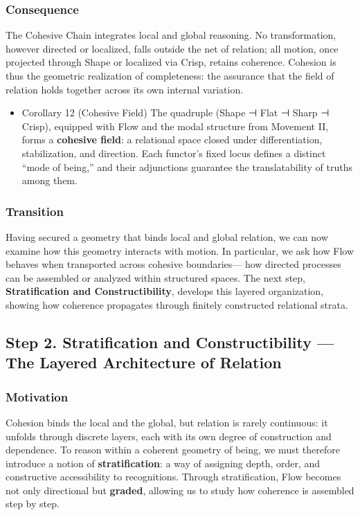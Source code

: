 \documentclass[11pt]{article}
\begin{document}
\subsubsection*{Consequence}
\label{sec:orgc48179e}
The Cohesive Chain integrates local and global reasoning.  
No transformation, however directed or localized, falls outside the net of relation;  
all motion, once projected through Shape or localized via Crisp, retains coherence.  
Cohesion is thus the geometric realization of completeness:  
the assurance that the field of relation holds together across its own internal variation.
\begin{itemize}
\item Corollary 12 (Cohesive Field)
\label{sec:org497c264}
The quadruple (Shape ⊣ Flat ⊣ Sharp ⊣ Crisp), equipped with Flow and the modal structure from Movement II,  
forms a \textbf{cohesive field}: a relational space closed under differentiation, stabilization, and direction.  
Each functor’s fixed locus defines a distinct “mode of being,”  
and their adjunctions guarantee the translatability of truths among them.
\end{itemize}
\subsubsection*{Transition}
\label{sec:org978a1ee}
Having secured a geometry that binds local and global relation,  
we can now examine how this geometry interacts with motion.  
In particular, we ask how Flow behaves when transported across cohesive boundaries—  
how directed processes can be assembled or analyzed within structured spaces.  
The next step, \textbf{Stratification and Constructibility}, develops this layered organization,  
showing how coherence propagates through finitely constructed relational strata.
\subsection*{Step 2. Stratification and Constructibility — The Layered Architecture of Relation}
\label{sec:org3407885}

\subsubsection*{Motivation}
\label{sec:orgdb8a161}
Cohesion binds the local and the global, but relation is rarely continuous:  
it unfolds through discrete layers, each with its own degree of construction and dependence.  
To reason within a coherent geometry of being,  
we must therefore introduce a notion of \textbf{stratification}:  
a way of assigning depth, order, and constructive accessibility to recognitions.  
Through stratification, Flow becomes not only directional but \textbf{graded},  
allowing us to study how coherence is assembled step by step.
\end{document}
